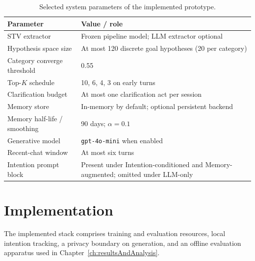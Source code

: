 \begin{table}[!ht]
  \centering
  \small
  \caption{Selected system parameters of the implemented prototype.}
  \label{tab:construction-config}
  \setlength{\tabcolsep}{4pt}
  \begin{tabular}{@{}p{}p{}@{}}
    \hline
    \textbf{Parameter} & \textbf{Value / role} \\
    \hline
    STV extractor & Frozen pipeline model; LLM extractor optional \\
    Hypothesis space size & At most 120 discrete goal hypotheses (20 per category) \\
    Category converge threshold & 0.55 \\
    Top-$K$ schedule & 10, 6, 4, 3 on early turns \\
    Clarification budget & At most one clarification act per session \\
    Memory store & In-memory by default; optional persistent backend \\
    Memory half-life / smoothing & 90 days; $\alpha = 0.1$ \\
    Generative model & \texttt{gpt-4o-mini} when enabled \\
    Recent-chat window & At most six turns \\
    Intention prompt block & Present under Intention-conditioned and Memory-augmented; omitted under LLM-only \\
    \hline
  \end{tabular}
\end{table}

\section{Implementation}
\label{sec:construction-implementation}

The implemented stack comprises training and evaluation resources, local intention tracking, a privacy boundary on generation, and an offline evaluation apparatus used in Chapter~\ref{ch:resultsAndAnalysis}.

